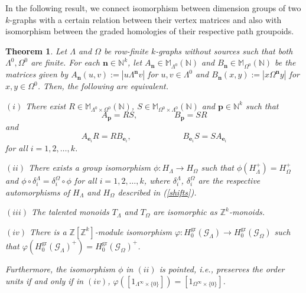 \documentclass[12pt]{amsart}
\newcommand{\N}{\mathbf{n}}
\newtheorem{thm}{Theorem}[section]
\theoremstyle{definition}
\theoremstyle{remark}
\newcommand{\gr}{\operatorname{gr}}
\begin{document}
In the following result, we connect isomorphism between dimension groups of two $k$-graphs with a certain relation between their vertex matrices and also with isomorphism between the graded homologies of their respective path groupoids.

\begin{thm}\label{th isomorphism of TM in terms of matrices}
Let $\Lambda$ and $\Omega$ be row-finite $k$-graphs without sources such that both $\Lambda^0,\Omega^0$ are finite. For each $\N\in \mathbb{N}^k$, let $A_\N\in \mathbb{M}_{\Lambda^0}(\mathbb{N})$ and $B_\N\in \mathbb{M}_{\Omega^0}(\mathbb{N})$ be the matrices given by $A_\N(u,v):=|u\Lambda^\N v|$ for $u,v\in \Lambda^0$ and $B_\N(x,y):=|x\Omega^\N y|$ for $x,y\in \Omega^0$. Then, the following are equivalent.

$(i)$ There exist $R\in \mathbb{M}_{\Lambda^0\times \Omega^0}(\mathbb{N})$, $S\in \mathbb{M}_{\Omega^0\times \Lambda^0}(\mathbb{N})$ and $\mathbf{p}\in \mathbb{N}^k$ such that \[A_\mathbf{p}=RS,~~~~~~~~~~~~~~~~~~~~B_\mathbf{p}=SR\] and \[A_{\mathbf{e}_i}R=RB_{\mathbf{e}_i},~~~~~~~~~~~~~~~~~~~~~~~~~~~~ B_{\mathbf{e}_i}S=SA_{\mathbf{e}_i}\] for all $i=1,2,\ldots,k$.

$(ii)$ There exists a group isomorphism $\phi: H_\Lambda \longrightarrow H_\Omega$ such that $\phi(H_\Lambda^+)=H_\Omega^+$ and $\phi \circ \delta_i^\Lambda=\delta_i^\Omega \circ \phi$ for all $i=1,2,\ldots,k$, where $\delta_i^\Lambda$, $\delta_i^\Omega$ are the respective automorphisms of $H_\Lambda$ and $H_\Omega$ described in \textup{(\ref{shifts})}.

$(iii)$ The talented monoids $T_\Lambda$ and $T_\Omega$ are isomorphic as $\mathbb{Z}^k$-monoids.

$(iv)$ There is a $\mathbb{Z}[\mathbb{Z}^k]$-module isomorphism $\varphi:H_0^{\gr}(\mathcal{G}_\Lambda)\longrightarrow H_0^{\gr}(\mathcal{G}_\Omega)$ such that $\varphi(H_0^{\gr}(\mathcal{G}_\Lambda)^+)=H_0^{\gr}(\mathcal{G}_\Omega)^+$.

Furthermore, the isomorphism $\phi$ in $(ii)$ is pointed, i.e., preserves the order units if and only if in $(iv)$, $\varphi([1_{\Lambda^\infty\times \{0\}}])=[1_{\Omega^\infty\times \{0\}}]$.
\end{thm}
\end{document}
